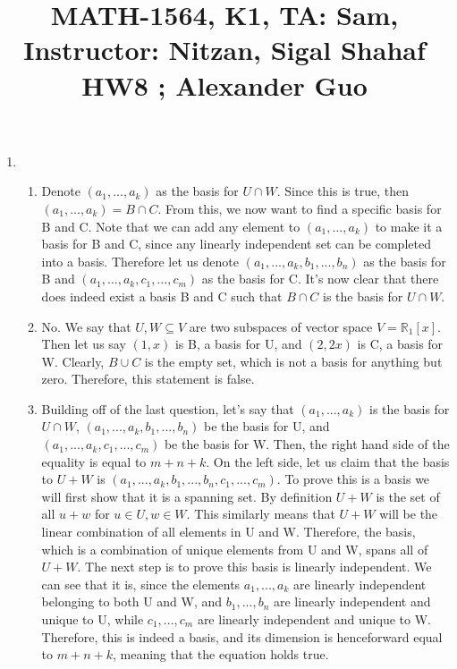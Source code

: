 \documentclass{article}
\title{\large{\vspace{-1.0cm}MATH-1564, K1, TA: Sam, Instructor: Nitzan, Sigal Shahaf \\ HW8 ; Alexander Guo}}
\date{}
\begin{document}
\maketitle

\vspace{-1.5cm}
\large

\begin{enumerate}

\item

\begin{enumerate}

\item Denote $(a_1,...,a_k)$ as the basis for $U \cap W$. Since this is true, then $(a_1,...,a_k) = B \cap C$. From this, we now want to find a specific basis for B and C. Note that we can add any element to $(a_1,...,a_k)$ to make it a basis for B and C, since any linearly independent set can be completed into a basis. Therefore let us denote $(a_1,...,a_k,b_1,...,b_n)$ as the basis for B and $(a_1,...,a_k,c_1,...,c_m)$ as the basis for C. It's now clear that there does indeed exist a basis B and C such that $B \cap C$ is the basis for $U \cap W$.

\item No. We say that $U,W \subseteq V$ are two subspaces of vector space $V = \mathbb{R}_1[x]$. Then let us say $(1,x)$ is B, a basis for U, and $(2,2x)$ is C, a basis for W. Clearly, $B \cup C$ is the empty set, which is not a basis for anything but zero. Therefore, this statement is false.

\item Building off of the last question, let's say that $(a_1,...,a_k)$ is the basis for $U \cap W$, $(a_1,...,a_k,b_1,...,b_n)$ be the basis for U, and $(a_1,...,a_k,c_1,...,c_m)$ be the basis for W. Then, the right hand side of the equality is equal to $m+n+k$. On the left side, let us claim that the basis to $U+W$ is $(a_1,...,a_k,b_1,...,b_n,c_1,...,c_m)$. To prove this is a basis we will first show that it is a spanning set. By definition $U+W$ is the set of all $u+w$ for $u \in U, w \in W$. This similarly means that $U+W$ will be the linear combination of all elements in U and W. Therefore, the basis, which is a combination of unique elements from U and W, spans all of $U+W$. The next step is to prove this basis is linearly independent. We can see that it is, since the elements $a_1,...,a_k$ are linearly independent belonging to both U and W, and $b_1,...,b_n$ are linearly independent and unique to U, while $c_1,...,c_m$ are linearly independent and unique to W. Therefore, this is indeed a basis, and its dimension is henceforward equal to $m + n + k$, meaning that the equation holds true.


\end{enumerate}
\end{enumerate}
\end{document}
